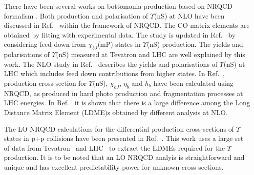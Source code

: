 There have been several works on bottomonia production based on
NRQCD formalism \cite{Domenech:1999qg,Domenech:2000ri,Braaten:2000cm,Gong:2010bk,Sharma:2012dy}.
Both production and polarisation of $\Upsilon$(nS) at NLO have been discussed in 
Ref.~\cite{Gong:2013qka} within the framework of NRQCD. The CO matrix elements are obtained
by fitting with experimental data. The study is updated in Ref.~\cite{Feng:2015wka} by considering
feed down from $\chi_{bJ}$(mP) states in $\Upsilon$(nS) production. The yields and
polarisations of $\Upsilon$(nS) measured at Tevatron and LHC are well explained by this work.
The NLO study in Ref.~\cite{Han:2014kxa} describes the yields and polarisations of
$\Upsilon$(nS) at LHC which includes feed down contributions from
higher states. In Ref.~\cite{Yu:2017pot}, production cross-section for $\Upsilon$(nS),
$\chi_{bJ}$, $\eta_b$ and $h_b$ have been calculated using NRQCD, as produced in hard
photo production and fragmentation processes at LHC energies. 
In Ref.~\cite{Kumar:2021sek} it is shown that there is a large difference among the
Long Distance Matrix Element (LDME)s obtained by different analysis at NLO.

The LO NRQCD calculations for the differential production
cross-sections of $\Upsilon$ states in p+p collisions have been presented
in Ref.~\cite{Kumar:2021sek}.
This work uses a large set of data from Tevatron~\cite{Acosta:2001gv} and
LHC~\cite{CMS:2013qur,LHCb:2012aa,CMS:2015xqv,ATLAS:2012lmu,Sirunyan:2017qdw} 
to extract the LDMEs required for the $\Upsilon$ production.
It is to be noted that an LO NRQCD analyis is straightforward and unique and has excellent
predictability power for unknown cross sections.

